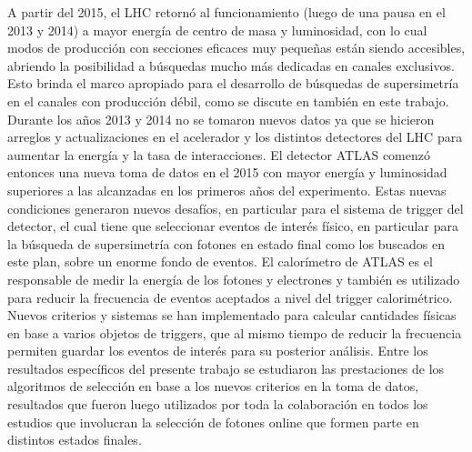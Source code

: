 A partir del 2015, el LHC retornó al funcionamiento (luego de una pausa en el 2013 y 2014) a mayor energía de centro de masa y luminosidad, con lo cual modos de producción con secciones eficaces muy pequeñas están siendo accesibles, abriendo la posibilidad a búsquedas mucho más dedicadas en canales exclusivos. Esto brinda el marco apropiado para el desarrollo de búsquedas de supersimetría en el canales con producción débil, como se discute en también en este trabajo.
Durante los años 2013 y 2014 no se tomaron nuevos datos ya que se hicieron arreglos y actualizaciones en el acelerador y los distintos detectores del LHC para aumentar la energía y la tasa de interacciones. El detector ATLAS comenzó entonces una nueva toma de datos en el 2015 con mayor energía y luminosidad superiores a las alcanzadas en los primeros años del experimento. Estas nuevas condiciones generaron nuevos desafíos, en particular para el sistema de trigger del detector, el cual tiene que seleccionar eventos de interés físico, en particular para la búsqueda de supersimetría con fotones en estado final como los buscados en este plan, sobre un enorme fondo de eventos. El calorímetro de ATLAS es el responsable de medir la energía de los fotones y electrones y también es utilizado para reducir la frecuencia de eventos aceptados a nivel del trigger calorimétrico. Nuevos criterios y sistemas se han implementado para calcular cantidades físicas en base a varios objetos de triggers, que al mismo tiempo de reducir la frecuencia permiten guardar los eventos de interés para su posterior análisis. Entre los resultados específicos del presente trabajo se estudiaron las prestaciones de los algoritmos de selección en base a los nuevos criterios en la toma de datos, resultados que fueron luego utilizados por toda la colaboración en todos los estudios que involucran la selección de fotones online que formen parte en distintos estados finales. 
